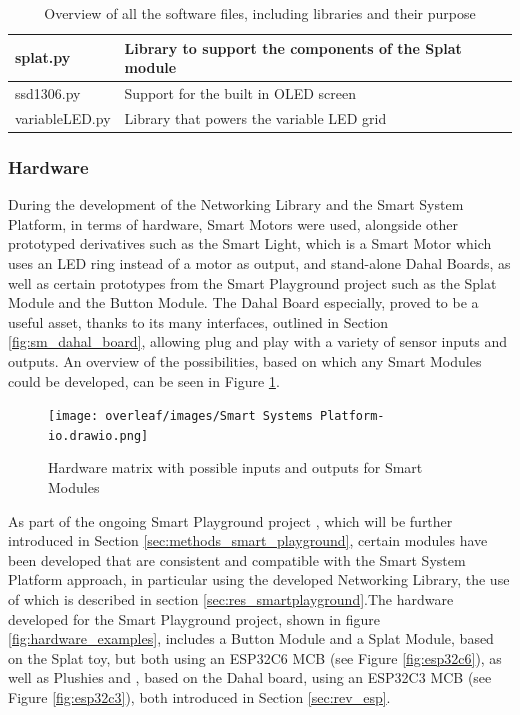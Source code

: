 \begin{table}[H]
\begin{tabular}{|l|p{180pt}|l|}
        \hline
        splat.py & Library to support the components of the Splat module & \citet{hankin_smart_nodate} \\
        \hline
        ssd1306.py & Support for the built in OLED screen & \citet{lehmann_micropython_nodate} \\
        \hline
        variableLED.py & Library that powers the variable LED grid & \citet{hankin_smart_nodate} \\
        \hline
    \end{tabular}
    \vspace{\ftspace}
    \caption{Overview of all the software files, including libraries and their purpose}
    \label{tab:software_files}
\end{table}

\subsubsection{\label{sec:methods_hw}Hardware}
During the development of the Networking Library and the Smart System Platform, in terms of hardware, Smart Motors were used, alongside other prototyped derivatives such as the Smart Light, which is a Smart Motor which uses an LED ring instead of a motor as output, and stand-alone Dahal Boards, as well as certain prototypes from the Smart Playground project such as the Splat Module and the Button Module. The Dahal Board especially, proved to be a useful asset, thanks to its many interfaces, outlined in Section \ref{fig:sm_dahal_board}, allowing plug and play with a variety of sensor inputs and outputs. An overview of the possibilities, based on which any Smart Modules could be developed, can be seen in Figure \ref{fig:met_hardware}.

\begin{figure}[H]
    \centering
    \texttt{[image: overleaf/images/Smart Systems Platform-io.drawio.png]}
    \vspace{\ftspace}
    \caption{Hardware matrix with possible inputs and outputs for Smart Modules}
    \label{fig:met_hardware}
\end{figure}

As part of the ongoing Smart Playground project \citep{jess_smart_2025}, which will be further introduced in Section \ref{sec:methods_smart_playground}, certain modules have been developed that are consistent and compatible with the Smart System Platform approach, in particular using the developed Networking Library, the use of which is described in section \ref{sec:res_smartplayground}.The hardware developed for the Smart Playground project, shown in figure \ref{fig:hardware_examples}, includes a Button Module and a Splat Module, based on the Splat toy, but both using an ESP32C6 MCB (see Figure \ref{fig:esp32c6}), as well as Plushies and , based on the Dahal board, using an ESP32C3 MCB (see Figure \ref{fig:esp32c3}), both introduced in Section \ref{sec:rev_esp}.

